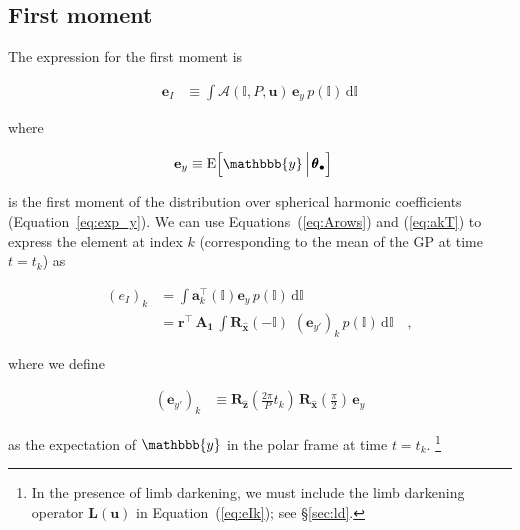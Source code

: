 \documentclass[modern,linenumbers]{aastex62}
\begin{document}
\subsection{First moment}
\label{sec:inc-mom1}
The expression for the first moment is
%
\begin{linenomath}\begin{align}
        \mathbf{e}_I
         & \equiv
        \int
        \pmb{\mathcal{A}}(\mathbb{I}, P, \mathbf{u}) \,
        \mathbf{e}_y \,
        p(\mathbb{I}) \,
        \mathrm{d}\mathbb{I}
    \end{align}\end{linenomath}
%
where
%
\begin{linenomath}\begin{align}
        \mathbf{e}_y
         & \equiv
        \mathrm{E} \Big[ \mathbbb{y} \, \Big| \, \pmb{\theta}_\bullet \Big]
    \end{align}\end{linenomath}
%
is the first moment of the distribution over spherical harmonic coefficients
(Equation~\ref{eq:exp_y}). We can use Equations~(\ref{eq:Arows})
and (\ref{eq:akT})
to express the element at index $k$ (corresponding to the mean of the
GP at time $t = t_k$) as
%
\begin{linenomath}\begin{align}
        \label{eq:eIk}
        \left(e_I\right)_k
         & =
        \int
        \mathbf{a}_k^\top(\mathbb{I})
        \mathbf{e}_y \,
        p(\mathbb{I}) \,
        \mathrm{d}\mathbb{I}
        \nonumber \\
         & =
        \mathbf{r}^\top \,
        \mathbf{A_1} \,
        \int
        \mathbf{R}_{\hat{\mathbf{x}}}\left(-\mathbb{I}\right) \,
        \,
        \left(\mathbf{e}_{y'}\right)_k \,
        p(\mathbb{I}) \,
        \mathrm{d}\mathbb{I}
        \quad,
    \end{align}\end{linenomath}
%
where we define
%
\begin{linenomath}\begin{align}
        \left(\mathbf{e}_{y'}\right)_k
         & \equiv
        \mathbf{R}_{\hat{\mathbf{z}}}\left(\frac{2\pi}{P}t_k\right) \,
        \mathbf{R}_{\hat{\mathbf{x}}}\left(\frac{\pi}{2}\right) \,
        \mathbf{e}_y
    \end{align}\end{linenomath}
%
as the expectation of $\mathbbb{y}$ in the polar frame at time $t = t_k$.%
\footnote{In the presence of limb darkening, we must include the limb
    darkening operator $\mathbf{L}(\mathbf{u})$ in Equation~(\ref{eq:eIk});
    see \S\ref{sec:ld}.}
\end{document}
